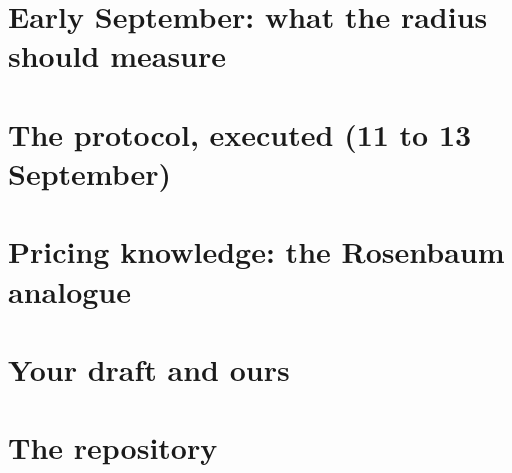 \documentclass[11pt,a4paper,oneside]{book}
\begin{document}
\part{Early September: what the radius should measure}



\part{The protocol, executed (11 to 13 September)}





\part{Pricing knowledge: the Rosenbaum analogue}




\part{Your draft and ours}



\part{The repository}


\appendix
\apostilarespostas
\end{document}
